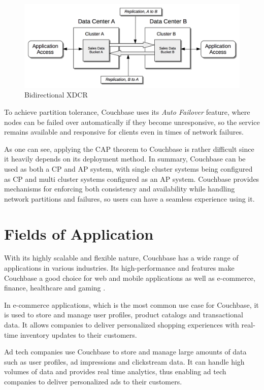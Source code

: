 \begin{figure}[H]
    \centering
        \includegraphics[scale=0.7]{images/bidirectional-xdcr.png}
    \caption{Bidirectional XDCR \parencite{XDCR.20230402}}
    \label{fig:BidiXDCR}
\end{figure}

To achieve partition tolerance, Couchbase uses its \textit{Auto Failover} feature, where nodes can be failed over automatically if they become unresponsive, so the service remains available and responsive for clients even in times of network failures\parencite{Autofailover.20230402}.

As one can see, applying the \ac{CAP} theorem to Couchbase is rather difficult since it heavily depends on its deployment method. In summary, Couchbase can be used as both a CP and AP system, with single cluster systems being configured as CP and multi cluster systems configured as an AP system. Couchbase provides mechanisms for enforcing both consistency and availability while handling network partitions and failures, so users can have a seamless experience using it.

\section{Fields of Application}

With its highly scalable and flexible nature, Couchbase has a wide range of applications in various industries. Its high-performance and features make Couchbase a good choice for web and mobile applications as well as e-commerce, finance, healthcare and gaming \parencite{CouchbaseWebsite.20230329}.

In e-commerce applications, which is the most common use case for Couchbase, it is used to store and manage user profiles, product catalogs and transactional data. It allows companies to deliver personalized shopping experiences with real-time inventory updates to their customers.

Ad tech companies use Couchbase to store and manage large amounts of data such as user profiles, ad impressions and clickstream data. It can handle high volumes of data and provides real time analytics, thus enabling ad tech companies to deliver personalized ads to their customers.


